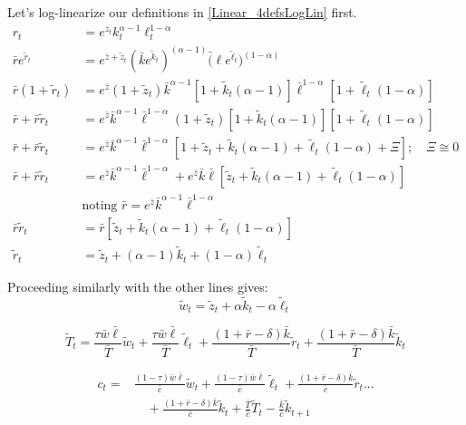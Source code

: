 \documentclass[letterpaper,12pt]{article}
\theoremstyle{definition}
\begin{document}
\begin{spacing}{1.5}
		Let's log-linearize our definitions in \eqref{Linear_4defsLogLin} first.
		\begin{equation} \label{Linear_rdefbLogLin}
		\begin{split}
		r_t &=e^{z_t}k_t^{\alpha-1}\ell_t^{1-\alpha} \\
		\bar r e^{\tilde r_t} &=e^{\bar z + \tilde z_t}(\bar k e^{\tilde k_t})^{(\alpha-1)}\bar (\ell e^{\tilde \ell_t})^{(1-\alpha)} \\
		 \bar r (1+\tilde r_t) &=e^{\bar z}(1+\tilde z_t)\bar k^{\alpha-1}[1+\tilde k_t(\alpha-1)]\bar \ell^{1-\alpha}[1+\tilde \ell_t(1-\alpha)] \\
		\bar r +\bar r \tilde r_t &=e^{\bar z}\bar k^{\alpha-1} \bar \ell^{1-\alpha}(1+\tilde z_t)[1+\tilde k_t(\alpha-1)][1+\tilde \ell_t(1-\alpha)] \\
		\bar r +\bar r \tilde r_t &=e^{\bar z}\bar k^{\alpha-1} \bar \ell^{1-\alpha}[1+\tilde z_t +\tilde k_t(\alpha-1)+\tilde \ell_t(1-\alpha) + \Xi] ; \quad \Xi \cong 0\\
		\bar r +\bar r \tilde r_t &=e^{\bar z}\bar k^{\alpha-1} \bar \ell^{1-\alpha} + e^{\bar z}\bar k \bar \ell[\tilde z_t +\tilde k_t(\alpha-1)+\tilde \ell_t(1-\alpha)] \\
		&  \text{noting } \bar r =e^{\bar z}\bar k^{\alpha-1} \bar \ell^{1-\alpha} \\
		\bar r \tilde r_t &=\bar r [\tilde z_t +\tilde k_t(\alpha-1)+\tilde \ell_t(1-\alpha)] \\
		\tilde r_t & =\tilde z_t +(\alpha-1)\tilde k_t+(1-\alpha)\tilde \ell_t
		\end{split}
		\end{equation}

		Proceeding similarly with the other lines gives:
		\begin{equation}
		\tilde w_t =\tilde z_t +\alpha \tilde k_t-\alpha \tilde \ell_t
		\end{equation}

		\begin{equation}
		\tilde T_t =\frac{\tau \bar w \bar \ell}{\bar T}\tilde w_t + \frac{\tau \bar w \bar \ell}{\bar T}\tilde \ell_t+\frac{(1+\bar r-\delta)\bar k}{\bar T}\tilde r_t + \frac{(1+\bar r-\delta)\bar k}{\bar T}\tilde k_t
		\end{equation}

		\begin{equation}\label{Linear_cdefLogLin}
		\begin{split}
		c_t =&\frac{ (1-\tau)\bar w \bar \ell}{\bar c} \tilde w_t + \frac{ (1-\tau)\bar w \bar \ell}{\bar c}\tilde \ell_t+\frac{ (1+\bar r-\delta) \bar k}{\bar c}\tilde r_t  ... \\
		&\quad +\frac{ (1+\bar r-\delta) \bar k}{\bar c}\tilde k_t + \frac{\bar T}{\bar c}\tilde T_t -\frac{\bar k}{\bar c} \tilde k_{t+1}
		\end{split}
		\end{equation}


\end{spacing}
\end{document}
